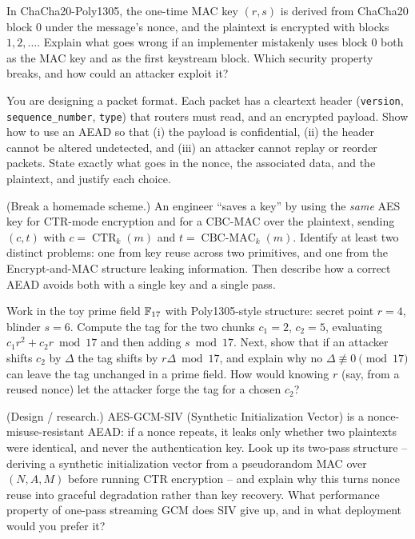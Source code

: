 \begin{exercise}
In ChaCha20-Poly1305, the one-time MAC key $(r,s)$ is derived from ChaCha20 block $0$ under the message's nonce, and the plaintext is encrypted with blocks $1, 2, \dots$. Explain what goes wrong if an implementer mistakenly uses block $0$ both as the MAC key and as the first keystream block. Which security property breaks, and how could an attacker exploit it?
\end{exercise}

\begin{exercise}
You are designing a packet format. Each packet has a cleartext header (\texttt{version}, \texttt{sequence\_number}, \texttt{type}) that routers must read, and an encrypted payload. Show how to use an AEAD so that (i) the payload is confidential, (ii) the header cannot be altered undetected, and (iii) an attacker cannot replay or reorder packets. State exactly what goes in the nonce, the associated data, and the plaintext, and justify each choice.
\end{exercise}

\begin{exercise}
(Break a homemade scheme.) An engineer ``saves a key'' by using the \emph{same} AES key for CTR-mode encryption and for a CBC-MAC over the plaintext, sending $(c, t)$ with $c = \operatorname{CTR}_k(m)$ and $t = \operatorname{CBC\text{-}MAC}_k(m)$. Identify at least two distinct problems: one from key reuse across two primitives, and one from the Encrypt-and-MAC structure leaking information. Then describe how a correct AEAD avoids both with a single key and a single pass.
\end{exercise}

\begin{exercise}
Work in the toy prime field $\mathbb{F}_{17}$ with Poly1305-style structure: secret point $r = 4$, blinder $s = 6$. Compute the tag for the two chunks $c_1 = 2$, $c_2 = 5$, evaluating $c_1 r^2 + c_2 r \bmod 17$ and then adding $s \bmod 17$. Next, show that if an attacker shifts $c_2$ by $\Delta$ the tag shifts by $r\Delta \bmod 17$, and explain why no $\Delta \not\equiv 0 \pmod{17}$ can leave the tag unchanged in a prime field. How would knowing $r$ (say, from a reused nonce) let the attacker forge the tag for a chosen $c_2$?
\end{exercise}

\begin{exercise}
(Design / research.) AES-GCM-SIV (Synthetic Initialization Vector) is a nonce-misuse-resistant AEAD: if a nonce repeats, it leaks only whether two plaintexts were identical, and never the authentication key. Look up its two-pass structure -- deriving a synthetic initialization vector from a pseudorandom MAC over $(N, A, M)$ before running CTR encryption -- and explain why this turns nonce reuse into graceful degradation rather than key recovery. What performance property of one-pass streaming GCM does SIV give up, and in what deployment would you prefer it?
\end{exercise}
